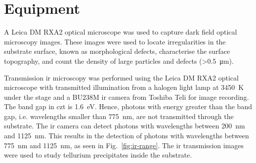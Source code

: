 

\section{Equipment}


A Leica DM RXA2 optical microscope was used to capture dark field optical microscopy images. These images were used to locate irregularities in the substrate surface, known as morphological defects, characterise the surface topography, and count the density of large particles and defects (\SI{>0.5}{\micro\metre}).

Transmission \ac{ir} microscopy was performed using the Leica DM RXA2 optical microscope with transmitted illumination from a halogen light lamp at \SI{3450}{\kelvin} under the stage and a BU238M \ac{ir} camera from Toshiba Teli for image recording. The band gap in \ac{czt} is \SI{1.6}{\electronvolt}. Hence, photons with energy greater than the band gap, i.e. wavelengths smaller than \SI{775}{\nano\metre}, are not transmitted through the substrate. The \ac{ir} camera can detect photons with wavelengths between \SI{200}{\nano\metre} and \SI{1125}{\nano\metre}. This results in the detection of photons with wavelengths between \SI{775}{\nano\metre} and \SI{1125}{\nano\metre}, as seen in Fig.~\ref{fig:ir-range}. The \ac{ir} transmission images were used to study tellurium precipitates inside the substrate. %

